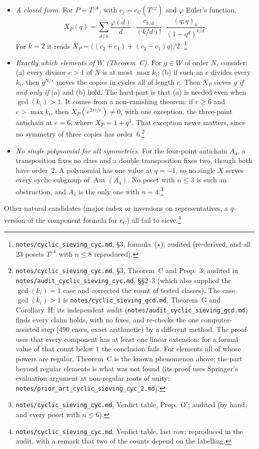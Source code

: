 \documentclass[11pt]{article}
\theoremstyle{definition}
\theoremstyle{remark}
\newcommand{\Aut}{\operatorname{Aut}}
\newcommand{\src}[1]{\nolinkurl{#1}}
\newcommand{\tagbox}[1]{\leavevmode\marginpar{\raggedright\fbox{\parbox{0.66in}{\centering\scriptsize\sffamily #1}}}}
\newcommand{\PROVEN}{\tagbox{PROVEN\\AUDITED}}
\newcommand{\COMPUTED}{\tagbox{COMPUTED}}
\begin{document}
\begin{itemize}
\item \PROVEN \emph{A closed form.} For $P=T^{\sqcup k}$, with
  $c_j=e_C(T^{\sqcup j})$ and $\varphi$ Euler's function,
  \[
  X_P(q)=\sum_{d\mid k}\frac{\varphi(d)}{d}\cdot\frac{c_{k/d}}{(k/d)!}\cdot
  \frac{(q;q)_k}{(1-q^d)^{k/d}}.
  \]
  For $k=2$ it reads $X_P=\bigl((c_2+c_1)+(c_2-c_1)q\bigr)/2$.%
  \footnote{\src{notes/cyclic_sieving_cyc.md}, \S3, formula~($\star$);
  audited (re-derived, and all $23$ posets $T^{\sqcup k}$ with $n\le8$
  reproduced).}
\item \PROVEN \emph{Exactly which elements of $W$ (Theorem~C).} For
  $g\in W$ of order $N$, consider: (a) every divisor $e>1$ of $N$ is at
  most $\max k_i$; (b) if such an $e$ divides every $k_i$, then $g^{N/e}$
  moves the copies in cycles all of length $e$. Then $X_P$ sieves $g$
  \emph{if and only if} (a) and (b) hold. The hard part is that (a) is
  needed even when $\gcd(k_i)>1$. It comes from a non-vanishing theorem:
  if $e\ge6$ and $e>\max k_i$, then $X_P(e^{2\pi i/e})\ne0$, with one
  exception, the three-point antichain at $e=6$, where $X_P=1+q^3$. That
  exception never matters, since no symmetry of three copies has
  order~$6$.\footnote{%
  \src{notes/cyclic_sieving_cyc.md}, \S3, Theorem~C and Prop.~3; audited in
  \src{notes/audit_cyclic_sieving_cyc.md}, \S\S2--3 (which also supplied
  the $\gcd(k_i)=1$ case and corrected the count of tested classes). The
  case $\gcd(k_i)>1$ is \src{notes/cyclic_sieving_gcd.md}, Theorem~G and
  Corollary~H; its independent audit
  (\src{notes/audit_cyclic_sieving_gcd.md}) finds every claim holds, with
  no fixes, and re-checks the one computer-assisted step ($490$ cases, exact
  arithmetic) by a different method. The proof uses that every component
  has at least one linear extension: for a formal value of that count below
  $1$ the conclusion fails. For
  elements all of whose powers are regular, Theorem~C is the known
  phenomenon above; the part beyond regular elements is what was not
  found (its proof uses Springer's evaluation argument at non-regular roots
  of unity; \src{notes/prior_art_cyclic_sieving_cyc_2.md}).}
\item \PROVEN \emph{No single polynomial for all symmetries.} For the
  four-point antichain $A_4$, a transposition fixes no class and a double
  transposition fixes two, though both have order~$2$. A polynomial has
  one value at $q=-1$, so no single $X$ serves every cyclic subgroup of
  $\Aut(A_4)$. No poset with $n\le3$ is such an obstruction, and $A_4$ is
  the only one with $n=4$.\footnote{\src{notes/cyclic_sieving_cyc.md},
  Verdict table, Prop.~O$'$; audited (by hand, and every poset with
  $n\le6$).}
\end{itemize}
Other natural candidates (major index or inversions on representatives, a
$q$-version of the component formula for $e_C$) all fail to sieve.\footnote{%
\src{notes/cyclic_sieving_cyc.md}, Verdict table, last row; reproduced in the
audit, with a remark that two of the counts depend on the labelling.}%
\COMPUTED
\end{document}
